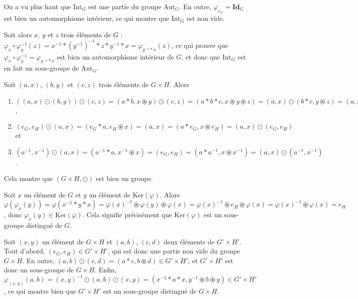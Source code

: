 \begin{sol}
On a vu plus haut que $\mathrm{Int}_G$ est une partie du groupe $\mathrm{Aut}_G$.
En outre, $\varphi_{e_G} = \mathbf{Id}_G$ est bien un automorphisme intérieur,
ce qui montre que $\mathrm{Int}_G$ est non vide.

Soit alors $x$, $y$ et $z$ trois éléments de $G$ :
$\varphi_x\circ\varphi_y^{-1}(z) = x^{-1} \ast (y^{-1})^{-1} \ast z \ast y^{-1} \ast x =
\varphi_{y^{-1} \ast x}(z)$,
ce qui prouve que $\varphi_x\circ\varphi_y^{-1} = \varphi_{y^{-1} \ast x}$ est bien
un automorphisme intérieur de $G$, et donc que $\mathrm{Int}_G$ est en fait
un sous-groupe de $\mathrm{Aut}_G$.
\end{sol}

\begin{sol}
Soit $(a,x)$, $(b,y)$ et $(c,z)$ trois éléments de $G \times H$. Alors
\begin{enumerate}
\item $((a,x) \odot (b,y)) \odot (c,z) = (a \ast b, x \circledast y) \odot (c,z) =
(a \ast b \ast c, x \circledast y \circledast z) = (a,x) \odot (b \ast c, y \circledast z) = (a,x) \odot ((b,y) \odot (c,z))$,
\item $(e_G, e_H) \odot (a,x) = (e_G \ast a, e_H \circledast x) = (a,x) =
(a \ast e_G, x \circledast e_H) = (a,x) \odot (e_G, e_H)$ et
\item $(a^{-1}, x^{-1}) \odot (a,x) = (a^{-1} \ast a, x^{-1} \circledast x) = (e_G, e_H) =
(a \ast a^{-1}, x \circledast x^{-1}) = (a,x) \odot (a^{-1}, x^{-1})$.
\end{enumerate}
Cela montre que $(G \times H, \odot)$ est bien un groupe.
\end{sol}

\begin{sol}
Soit $x$ un élément de $G$ et $y$ un élément de $\mathrm{Ker}(\varphi)$.
Alors $\varphi(\varphi_x(y)) = \varphi(x^{-1} \ast y \ast x) = \varphi(x)^{-1} \circledast \varphi(y) \circledast \varphi(x) =
\varphi(x)^{-1} \circledast e_H \circledast \varphi(x) = \varphi(x)^{-1} \circledast \varphi(x) = e_H$, donc
$\varphi_x(y) \in \mathrm{Ker}(\varphi)$.
Cela signifie précisément que $\mathrm{Ker}(\varphi)$ est un sous-groupe distingué de $G$.
\end{sol}

\begin{sol}
Soit $(x,y)$ un élément de $G \times H$ et $(a,b)$, $(c,d)$ deux éléments de $G' \times H'$.
Tout d'abord, $(e_G, e_H) \in G' \times H'$, qui est donc une partie non vide du groupe $G \times H$.
En outre, $(a,b) \odot (c,d) = (a \ast c, b \circledast d) \in G' \times H'$, et
$G' \times H'$ est donc un sous-groupe de $G \times H$.
Enfin, $\varphi_{(x,y)}(a,b) = (x,y)^{-1} \odot (a,b) \odot (x,y) =
(x^{-1} \ast a \ast x, y^{-1} \circledast b \circledast y) \in
G' \times H'$,
ce qui montre bien que $G' \times H'$ est un sous-groupe distingué de $G \times H$.
\end{sol}

